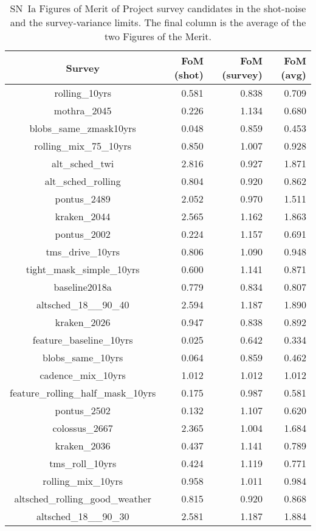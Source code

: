 \documentclass{aastex62}   	%
\begin{document}
\begin{table}
\caption{SN~Ia Figures of Merit of Project survey candidates
in  the shot-noise and the survey-variance limits.  The final column is the average
of the two Figures of the Merit.\label{table:ref}}
\centering
\begin{tabular}{|c|rrr|}
\hline
Survey & FoM (shot) & FoM (survey) & FoM (avg)\\
\hline
rolling\_10yrs  & 0.581 & 0.838 & 0.709  \\
mothra\_2045  & 0.226 & 1.134 & 0.680  \\
blobs\_same\_zmask10yrs  & 0.048 & 0.859 & 0.453  \\
rolling\_mix\_75\_10yrs  & 0.850 & 1.007 & 0.928  \\
alt\_sched\_twi  & 2.816 & 0.927 & 1.871  \\
alt\_sched\_rolling  & 0.804 & 0.920 & 0.862  \\
pontus\_2489  & 2.052 & 0.970 & 1.511  \\
kraken\_2044  & 2.565 & 1.162 & 1.863  \\
pontus\_2002  & 0.224 & 1.157 & 0.691  \\
tms\_drive\_10yrs  & 0.806 & 1.090 & 0.948  \\
tight\_mask\_simple\_10yrs  & 0.600 & 1.141 & 0.871  \\
baseline2018a  & 0.779 & 0.834 & 0.807  \\
altsched\_18\_\_90\_40  & 2.594 & 1.187 & 1.890  \\
kraken\_2026  & 0.947 & 0.838 & 0.892  \\
feature\_baseline\_10yrs  & 0.025 & 0.642 & 0.334  \\
blobs\_same\_10yrs  & 0.064 & 0.859 & 0.462  \\
cadence\_mix\_10yrs  & 1.012 & 1.012 & 1.012  \\
feature\_rolling\_half\_mask\_10yrs  & 0.175 & 0.987 & 0.581  \\
pontus\_2502  & 0.132 & 1.107 & 0.620  \\
colossus\_2667  & 2.365 & 1.004 & 1.684  \\
kraken\_2036  & 0.437 & 1.141 & 0.789  \\
tms\_roll\_10yrs  & 0.424 & 1.119 & 0.771  \\
rolling\_mix\_10yrs  & 0.958 & 1.011 & 0.984  \\
altsched\_rolling\_good\_weather  & 0.815 & 0.920 & 0.868  \\
altsched\_18\_\_90\_30  & 2.581 & 1.187 & 1.884  \\

\end{tabular}
\end{table}
\end{document}
